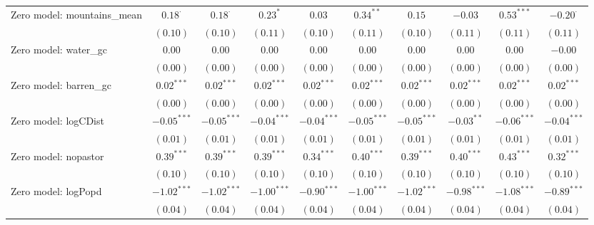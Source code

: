 \begin{table}
\begin{center}
{\begin{tabular}{l c c c c c c c c c}
Zero model: mountains\_mean    & $0.18^{\cdot}$ & $0.18^{\cdot}$ & $0.23^{*}$    & $0.03$        & $0.34^{**}$   & $0.15$          & $-0.03$       & $0.53^{***}$  & $-0.20^{\cdot}$ \\
                               & $(0.10)$       & $(0.10)$       & $(0.11)$      & $(0.10)$      & $(0.11)$      & $(0.10)$        & $(0.11)$      & $(0.11)$      & $(0.11)$        \\
Zero model: water\_gc          & $0.00$         & $0.00$         & $0.00$        & $0.00$        & $0.00$        & $0.00$          & $0.00$        & $0.00$        & $-0.00$         \\
                               & $(0.00)$       & $(0.00)$       & $(0.00)$      & $(0.00)$      & $(0.00)$      & $(0.00)$        & $(0.00)$      & $(0.00)$      & $(0.00)$        \\
Zero model: barren\_gc         & $0.02^{***}$   & $0.02^{***}$   & $0.02^{***}$  & $0.02^{***}$  & $0.02^{***}$  & $0.02^{***}$    & $0.02^{***}$  & $0.02^{***}$  & $0.02^{***}$    \\
                               & $(0.00)$       & $(0.00)$       & $(0.00)$      & $(0.00)$      & $(0.00)$      & $(0.00)$        & $(0.00)$      & $(0.00)$      & $(0.00)$        \\
Zero model: logCDist           & $-0.05^{***}$  & $-0.05^{***}$  & $-0.04^{***}$ & $-0.04^{***}$ & $-0.05^{***}$ & $-0.05^{***}$   & $-0.03^{**}$  & $-0.06^{***}$ & $-0.04^{***}$   \\
                               & $(0.01)$       & $(0.01)$       & $(0.01)$      & $(0.01)$      & $(0.01)$      & $(0.01)$        & $(0.01)$      & $(0.01)$      & $(0.01)$        \\
Zero model: nopastor           & $0.39^{***}$   & $0.39^{***}$   & $0.39^{***}$  & $0.34^{***}$  & $0.40^{***}$  & $0.39^{***}$    & $0.40^{***}$  & $0.43^{***}$  & $0.32^{***}$    \\
                               & $(0.10)$       & $(0.10)$       & $(0.10)$      & $(0.10)$      & $(0.10)$      & $(0.10)$        & $(0.10)$      & $(0.10)$      & $(0.10)$        \\
Zero model: logPopd            & $-1.02^{***}$  & $-1.02^{***}$  & $-1.00^{***}$ & $-0.90^{***}$ & $-1.00^{***}$ & $-1.02^{***}$   & $-0.98^{***}$ & $-1.08^{***}$ & $-0.89^{***}$   \\
                               & $(0.04)$       & $(0.04)$       & $(0.04)$      & $(0.04)$      & $(0.04)$      & $(0.04)$        & $(0.04)$      & $(0.04)$      & $(0.04)$        \\

\end{tabular}}
\end{center}
\end{table}
